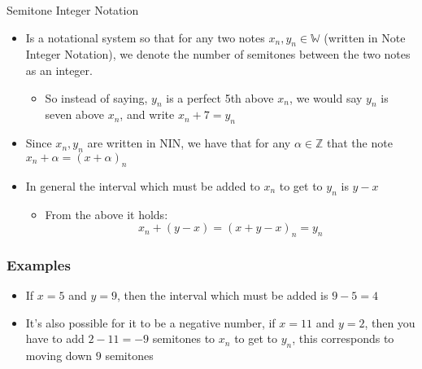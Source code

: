 \documentclass[preview]{standalone}
\begin{document}
\begin{defn*}{Semitone Integer Notation}
  \begin{itemize}
    \item Is a notational system so that for any two notes $x_{n}, y_{n} \in \mathbb{W}$ (written in Note Integer Notation), we denote the number of semitones between the two notes as an integer. 
      \begin{itemize}
        \item So instead of saying, $y_{n}$ is a perfect 5th above $x_{n}$, we would say $y_{n}$ is seven above $x_{n}$, and write $x_{n}  +  7 = y_{n}$ 
      \end{itemize}
    \item Since $x_{n}, y_{n}$ are written in NIN, we have that for any $\alpha \in \mathbb{Z}$ that the note $x_{n}  +  \alpha = \left( x  +  \alpha \right)_{n}$ 
    \item In general the interval which must be added to $x_{n}$ to get to $y_{n}$ is $y - x$ 
      \begin{itemize}
        \item From the above it holds: 
          \[
          x_{n}  +  \left( y  -  x \right) = \left( x  +  y  - x \right)_{n} = y_{n}
          \]
      \end{itemize}
  \end{itemize}
    \subsubsection*{Examples}
    \begin{itemize}
      \item If $x = 5$ and $y = 9$, then the interval which must be added is $9 - 5 = 4$ 
      \item It's also possible for it to be a negative number, if $x = 11$ and $y = 2$, then you have to add $2  -  11 = -9$ semitones to $x_{n}$ to get to $y_{n}$, this corresponds to moving down $9$ semitones
    \end{itemize}

\end{defn*}
\end{document}
